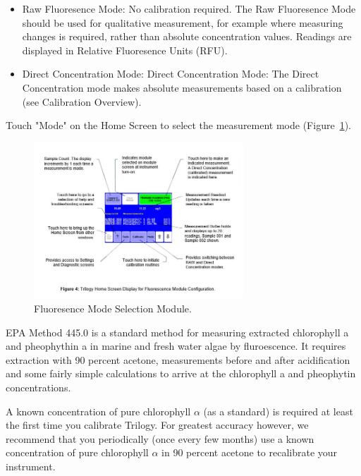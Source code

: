 \documentclass[12pt]{../SOP4_alpha}\usepackage[]{graphicx}\usepackage[]{color}
\begin{document}
\begin{description}
\begin{itemize}
  \item Raw Fluoresence Mode: No calibration required. The Raw Fluoresence Mode should be used for qualitative measurement, for example where measuring changes is required, rather than absolute concentration values. Readings are displayed in Relative Fluoresence Units (RFU).
  \item Direct Concentration Mode: Direct Concentration Mode: The Direct Concentration mode makes absolute measurements based on a calibration (see Calibration Overview).
\end{itemize}

\NP Touch "Mode" on the Home Screen to select the measurement mode (Figure~\ref{fig:fluoresencemode}).

\begin{figure}
  \centering
  \includegraphics[width=0.7\textwidth]{Capture4}
  \caption{Fluoresence Mode Selection Module.}
  \label{fig:fluoresencemode}
\end{figure}

\NP EPA Method 445.0 is a standard method for measuring extracted chlorophyll a and pheophythin a in marine and fresh water algae by fluroescence. It requires extraction with 90 percent acetone, measurements before and after acidification and some fairly simple calculations to arrive at the chlorophyll a and pheophytin concentrations.

\NP A known concentration of pure chlorophyll $\alpha$ (as a standard) is required at least the first time you calibrate Trilogy. For greatest accuracy however, we recommend that you periodically (once every few months) use a known concentration of pure chlorophyll $\alpha$ in 90 percent acetone to recalibrate your instrument. 


\end{description}
\end{document}
